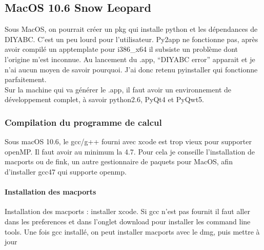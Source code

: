 \documentclass[12pt,a4paper]{article}
\begin{document}
    \subsection{MacOS 10.6 Snow Leopard}
        Sous MacOS, on pourrait cr\'eer un pkg qui installe python et les
        d\'ependances de DIYABC. C'est un peu lourd pour l'utilisateur. Py2app
        ne fonctionne pas, après avoir compil\'e un apptemplate pour i386\_x64
        il subsiste un problème dont l'origine m'est inconnue. Au lancement du
        .app, ``DIYABC error'' apparait et je n'ai aucun moyen de savoir
        pourquoi. J'ai donc retenu pyinstaller qui fonctionne parfaitement.\\

        Sur la machine qui va g\'en\'erer le .app, il faut avoir un
        environnement de d\'eveloppement complet, à savoir python2.6, PyQt4 et
        PyQwt5.

        \subsubsection{Compilation du programme de calcul}
        Sous macOS 10.6, le gcc/g++ fourni avec xcode est trop vieux pour supporter
        openMP. Il faut avoir au minimum la 4.7. Pour cela je conseille 
        l'installation de macports ou de fink, un autre gestionnaire de paquets pour MacOS,
        afin d'installer gcc47 qui supporte openmp.

        \paragraph{Installation des macports}
        Installation des macports : installer xcode. Si gcc n'est pas fournit
         il faut aller dans les preferences et dans l'onglet download pour installer les
         command line tools.
        Une fois gcc installé, on peut installer macports avec le dmg, puis mettre à jour

\end{document}
